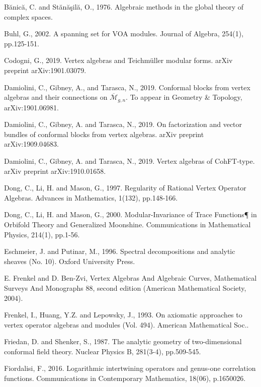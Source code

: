 \documentclass[12pt,a4paper,notitlepage]{article}
\theoremstyle{definition}
\theoremstyle{plain}
\newcommand{\mc}{\mathcal}
\newcommand{\ovl}{\overline}
\numberwithin{equation}{section}
\begin{document}
\begin{thebibliography}{999999}
		Bănică, C. and Stănăşilă, O., 1976. Algebraic methods in the global theory of complex spaces.
		
		Buhl, G., 2002. A spanning set for VOA modules. Journal of Algebra, 254(1), pp.125-151.
		
Codogni, G., 2019. Vertex algebras and Teichm\"uller modular forms. arXiv preprint arXiv:1901.03079.		
		
	Damiolini, C., Gibney, A., and Tarasca, N., 2019. Conformal blocks from vertex algebras and their connections on $\ovl{\mc M}_{g,n}$.  To appear in Geometry \& Topology, arXiv:1901.06981.
	
Damiolini, C., Gibney, A. and Tarasca, N., 2019. On factorization and vector bundles of conformal blocks from vertex algebras. arXiv preprint arXiv:1909.04683.

Damiolini, C., Gibney, A. and Tarasca, N., 2019. Vertex algebras of CohFT-type. arXiv preprint arXiv:1910.01658.
		
Dong, C., Li, H. and Mason, G., 1997. Regularity of Rational Vertex Operator Algebras. Advances in Mathematics, 1(132), pp.148-166.

Dong, C., Li, H. and Mason, G., 2000. Modular-Invariance of Trace Functions¶ in Orbifold Theory and Generalized Moonshine. Communications in Mathematical Physics, 214(1), pp.1-56.
		
		Eschmeier, J. and Putinar, M., 1996. Spectral decompositions and analytic sheaves (No. 10). Oxford University Press.
		
		E. Frenkel and D. Ben-Zvi, Vertex Algebras And Algebraic Curves, Mathematical Surveys And Monographs 88, second edition (American Mathematical Society, 2004).
		
		Frenkel, I., Huang, Y.Z. and Lepowsky, J., 1993. On axiomatic approaches to vertex operator algebras and modules (Vol. 494). American Mathematical Soc..
		
Friedan, D. and Shenker, S., 1987. The analytic geometry of two-dimensional conformal field theory. Nuclear Physics B, 281(3-4), pp.509-545.		
		
Fiordalisi, F., 2016. Logarithmic intertwining operators and genus-one correlation functions. Communications in Contemporary Mathematics, 18(06), p.1650026.		
		

\end{thebibliography}
\end{document}
